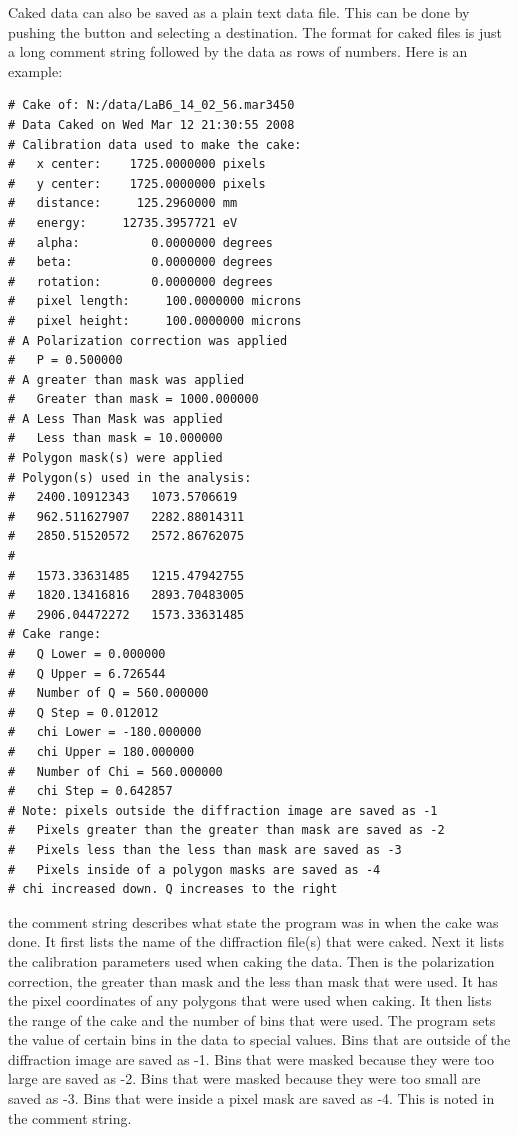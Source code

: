 Caked data can also be saved as a plain text data file.
This can be done by pushing the  button and
selecting a destination. The format for caked files is just
a long comment string followed by the data as rows of numbers.
Here is an example:
\begin{lstlisting}[caption={'caked\_data.dat'}]
# Cake of: N:/data/LaB6_14_02_56.mar3450 
# Data Caked on Wed Mar 12 21:30:55 2008
# Calibration data used to make the cake:
#   x center:    1725.0000000 pixels
#   y center:    1725.0000000 pixels
#   distance:     125.2960000 mm
#   energy:     12735.3957721 eV
#   alpha:          0.0000000 degrees
#   beta:           0.0000000 degrees
#   rotation:       0.0000000 degrees
#   pixel length:     100.0000000 microns
#   pixel height:     100.0000000 microns
# A Polarization correction was applied
#   P = 0.500000
# A greater than mask was applied
#   Greater than mask = 1000.000000
# A Less Than Mask was applied
#   Less than mask = 10.000000
# Polygon mask(s) were applied
# Polygon(s) used in the analysis:
#   2400.10912343	1073.5706619
#   962.511627907	2282.88014311
#   2850.51520572	2572.86762075
#
#   1573.33631485	1215.47942755
#   1820.13416816	2893.70483005
#   2906.04472272	1573.33631485
# Cake range:
#   Q Lower = 0.000000
#   Q Upper = 6.726544
#   Number of Q = 560.000000
#   Q Step = 0.012012
#   chi Lower = -180.000000
#   chi Upper = 180.000000
#   Number of Chi = 560.000000
#   chi Step = 0.642857
# Note: pixels outside the diffraction image are saved as -1
#   Pixels greater than the greater than mask are saved as -2
#   Pixels less than the less than mask are saved as -3
#   Pixels inside of a polygon masks are saved as -4
# chi increased down. Q increases to the right
\end{lstlisting}
the comment string describes what state the program was in when the 
cake was done. It first lists the name of the diffraction 
file(s) that were caked. Next it lists the calibration parameters 
used when caking the data. Then is the polarization correction, the greater 
than mask and the less than mask that were used. It has the pixel 
coordinates of any polygons that were used when caking.  It then lists 
the range of the cake and the number of bins that were used.
The program sets the value of certain bins in the data
to special values. Bins that are outside of the diffraction
image are saved as -1. Bins that were masked because they were too 
large are saved as -2. Bins that were masked because they were too 
small are saved as -3. Bins that were inside a pixel mask are saved 
as -4. This is noted in the comment string. 

